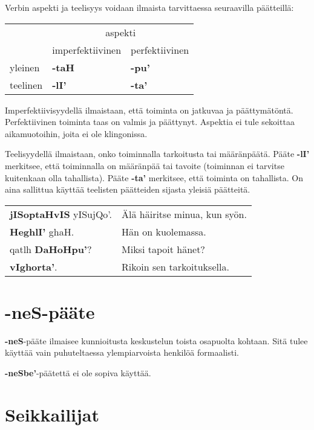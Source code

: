 \documentclass{book}
\begin{document}
Verbin aspekti ja teelisyys voidaan ilmaista tarvittaessa seuraavilla päätteillä:

\begin{tabular}{l l l}
    & \multicolumn{2}{c}{aspekti} \\
    & imperfektiivinen & perfektiivinen \\
    yleinen & \textbf{-taH} & \textbf{-pu'} \\
    teelinen & \textbf{-lI'} & \textbf{-ta'} \\
\end{tabular}

Imperfektiivisyydellä ilmaistaan, että toiminta on jatkuvaa ja päättymätöntä. 
Perfektiivinen toiminta taas on valmis ja päättynyt.
Aspektia ei tule sekoittaa aikamuotoihin, joita ei ole klingonissa.

Teelisyydellä ilmaistaan, onko toiminnalla tarkoitusta tai määränpäätä.
Pääte \textbf{-lI'} merkitsee, että toiminnalla on määränpää tai tavoite (toiminnan ei tarvitse kuitenkaan olla tahallista).
Pääte \textbf{-ta'} merkitsee, että toiminta on tahallista.
On aina sallittua käyttää teelisten päätteiden sijasta yleisiä päätteitä.

\begin{tabular}{l l}
    \textbf{jISoptaHvIS} yISujQo'. & Älä häiritse minua, kun syön. \\
    \textbf{HeghlI'} ghaH. & Hän on kuolemassa. \\
    qatlh \textbf{DaHoHpu'}? & Miksi tapoit hänet? \\
    \textbf{vIghorta'}. & Rikoin sen tarkoituksella. \\
\end{tabular}

\section{-neS-pääte}

\textbf{-neS}-pääte ilmaisee kunnioitusta keskustelun toista osapuolta kohtaan.
Sitä tulee käyttää vain puhuteltaessa ylempiarvoista henkilöä formaalisti.

\textbf{-neSbe'}-päätettä ei ole sopiva käyttää.

\section{Seikkailijat}
\end{document}
